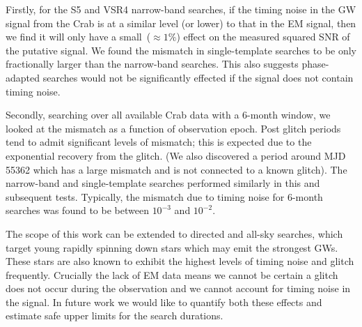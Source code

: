 \documentclass[../full_thesis/full_thesis.tex]{subfiles}
\begin{document}
Firstly, for the S5 and VSR4 narrow-band searches, if the timing noise in the
GW signal from the Crab is at a similar level (or lower) to that in the EM
signal, then we find it will only have a small~($\approx1\%$) effect on the
measured squared SNR of the putative signal.  We found the mismatch in
single-template searches to be only fractionally larger than the narrow-band
searches.  This also suggests phase-adapted searches would not be significantly
effected if the signal does not contain timing noise.

Secondly, searching over all available Crab data with a 6-month window, we
looked at the mismatch as a function of observation epoch. Post glitch periods
tend to admit significant levels of mismatch; this is expected due to the
exponential recovery from the glitch. (We also discovered a period around MJD
55362 which has a large mismatch and is not connected to a known glitch). The
narrow-band and single-template searches performed similarly in this and
subsequent tests. Typically, the mismatch due to timing noise for 6-month
searches was found to be between $10^{-3}$ and $10^{-2}$.

The scope of this work can be extended to  directed and all-sky searches, which
target young rapidly spinning down stars which may emit the strongest GWs.
These stars are also known to exhibit the highest levels of timing noise and
glitch frequently. Crucially the lack of EM data means we cannot be certain a
glitch does not occur during the observation and we cannot account for timing
noise in the signal.  In future work we would like to quantify both these
effects and estimate safe upper limits for the search durations.


\biblio
\end{document}
